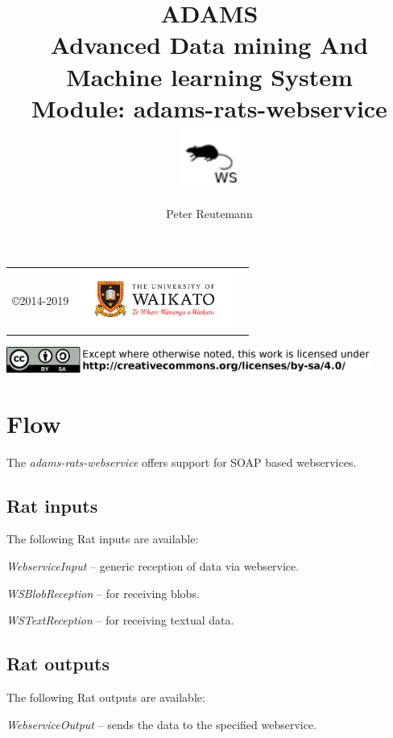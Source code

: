 \documentclass[a4paper]{book}
\title{
  \textbf{ADAMS} \\
  {\Large \textbf{A}dvanced \textbf{D}ata mining \textbf{A}nd \textbf{M}achine
  learning \textbf{S}ystem} \\
  {\Large Module: adams-rats-webservice} \\
  \vspace{1cm}
  \includegraphics[width=2cm]{images/rats-webservice-module.png} \\
}
\author{
  Peter Reutemann
}
\begin{document}
\begin{titlepage}
\maketitle

\thispagestyle{empty}
\center
\begin{table}[b]
	\begin{tabular}{c l l}
		\parbox[c][2cm]{2cm}{\copyright 2014-2019} &
		\parbox[c][2cm]{5cm}{\includegraphics[width=5cm]{images/coat_of_arms.pdf}}
	\end{tabular}
	\includegraphics[width=12cm]{images/cc.png} \\
\end{table}

\end{titlepage}

\tableofcontents


\chapter{Flow}

The \textit{adams-rats-webservice} offers support for SOAP\cite{soap} based
webservices.

\section{Rat inputs}
The following Rat inputs are available:
\begin{tight_itemize}
  \item \textit{WebserviceInput} -- generic reception of data via webservice.
  \item \textit{WSBlobReception} -- for receiving blobs.
  \item \textit{WSTextReception} -- for receiving textual data.
\end{tight_itemize}

\section{Rat outputs}
The following Rat outputs are available:
\begin{tight_itemize}
  \item \textit{WebserviceOutput} -- sends the data to the specified webservice.
\end{tight_itemize}
\end{document}
